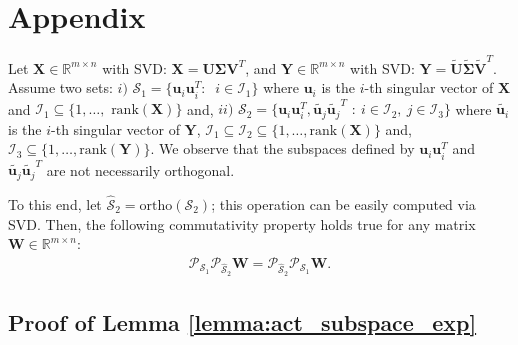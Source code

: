 \documentclass[twocolumn]{svjour3}
\newcommand{\signal}{\boldsymbol{X}}
\newcommand{\dimension}{m \times n}
\begin{document}
\section{Appendix}
\begin{remark}
Let $\signal \in \mathbb{R}^{\dimension}$ with SVD: $\signal = \boldsymbol{U} \boldsymbol{\Sigma} \boldsymbol{V}^T$, and $\boldsymbol{Y} \in \mathbb{R}^{\dimension}$ with SVD: $\boldsymbol{Y} = \widetilde{\boldsymbol{U}} \widetilde{\boldsymbol{\Sigma}} \widetilde{\boldsymbol{V}}^T$. Assume two sets: $i) $ $\mathcal{S}_1 = \lbrace \boldsymbol{u}_i\boldsymbol{u}_i^T: $ $~i \in \mathcal{I}_1 \rbrace $ where $\boldsymbol{u}_i $ is the $i$-th singular vector of $\signal$ and $\mathcal{I}_1 \subseteq \lbrace 1, \dots, $ $\text{rank}(\signal) \rbrace $ and, $ii)$ $\mathcal{S}_2 = \lbrace \boldsymbol{u}_i\boldsymbol{u}_i^T, \tilde{\boldsymbol{u}_j} \tilde{\boldsymbol{u}_j}^T $ $ :~i \in \mathcal{I}_2,~j \in \mathcal{I}_3 \rbrace $ where $\tilde{\boldsymbol{u}_i} $ is the $i$-th singular vector of $\boldsymbol{Y}$, $\mathcal{I}_1 \subseteq \mathcal{I}_2 \subseteq \lbrace 1, \dots, \text{rank}(\signal) \rbrace $ and, $\mathcal{I}_3 \subseteq \lbrace 1, \dots, \text{rank}(\boldsymbol{Y}) \rbrace $. We observe that the subspaces defined by $\boldsymbol{u}_i\boldsymbol{u}_i^T$ and $\tilde{\boldsymbol{u}_j} \tilde{\boldsymbol{u}_j}^T$ are not necessarily orthogonal. 

To this end, let $\widehat{\mathcal{S}}_2 = \text{ortho}(\mathcal{S}_2)$; this operation can be easily computed via SVD. Then, the following commutativity property holds true for any matrix $ \boldsymbol{W} \in \mathbb{R}^{\dimension} $:
\begin{align}
\mathcal{P}_{\mathcal{S}_1} \mathcal{P}_{\widehat{\mathcal{S}}_2} \boldsymbol{W} = \mathcal{P}_{\widehat{\mathcal{S}}_2} \mathcal{P}_{\mathcal{S}_1} \boldsymbol{W}.
\end{align} 
\end{remark}
\subsection{Proof of Lemma \ref{lemma:act_subspace_exp}}
\end{document}
